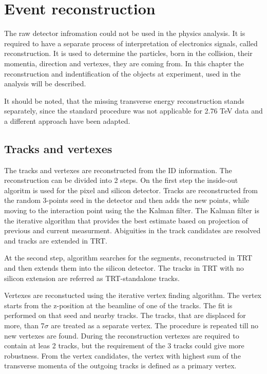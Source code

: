 \chapter{Event reconstruction}\label{chap:Rec}
\minitoc
The raw detector infromation could not be used in the physics analysis. It is required to have a separate process of interpretation of electronics signals, called reconstruction. It is used to determine the particles, born in the collision, their momentia, direction and vertexes, they are coming from. In this chapter the reconstruction and indentification of the objects at \atlas experiment, used in the analysis will be described. 

It should be noted, that the missing transverse energy reconstruction stands separately, since the standard procedure was not applicable for 2.76 TeV data and a different approach have been adapted.

\section{Tracks and vertexes}

The tracks and vertexes are reconstructed from the ID information\cite{Track}. The reconstruction can be divided into 2 steps. 
On the first step the inside-out algoritm is used for the pixel and silicon detector. Tracks are reconstructed from the random 3-points seed in the detector and then adds the new points, while moving to the interaction point using the the Kalman filter\cite{Kalman}.  The Kalman filter is the iterative algorithm that provides the best estimate based on projection of previous and current measurment.  Abiguities in the track candidates are resolved and tracks are extended in TRT.

At the second step, algorithm searches for the segments, reconstructed in TRT and then extends them into the silicon detector. The tracks in TRT with no silicon extension are referred as TRT-standalone tracks. 

Vertexes are reconstucted using the iterative vertex finding algorithm. The vertex starts from the z-position at the beamline of one of the tracks. The \chiD fit is performed on that seed and nearby tracks. The tracks, that are displaced for more, than 7$\sigma$ are treated as a separate vertex. The procedure is repeated till no new vertexes are found. During the reconstruction vertexes are required to contain at leas 2 tracks, but the requirement of the 3 tracks could give more robustness. From the vertex candidates, the vertex with highest sum of the transverse momenta of the outgoing tracks is defined as a primary vertex.

